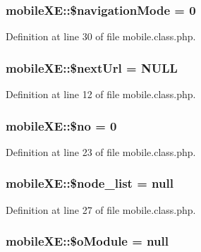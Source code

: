 \subsubsection[{\$navigation\+Mode}]{\setlength{\rightskip}{0pt plus 5cm}mobile\+X\+E\+::\$navigation\+Mode = 0}\label{classmobileXE_aa6e85b2d6fe4667d7d0a3a2b3f13bd12}


Definition at line 30 of file mobile.\+class.\+php.

\hypertarget{classmobileXE_adbdb5909b975bb776f91817d2392aaca}{}
\subsubsection[{\$next\+Url}]{\setlength{\rightskip}{0pt plus 5cm}mobile\+X\+E\+::\$next\+Url = N\+U\+L\+L}\label{classmobileXE_adbdb5909b975bb776f91817d2392aaca}


Definition at line 12 of file mobile.\+class.\+php.

\hypertarget{classmobileXE_a497e828014cdb6eaef56dd42d0f816e6}{}
\subsubsection[{\$no}]{\setlength{\rightskip}{0pt plus 5cm}mobile\+X\+E\+::\$no = 0}\label{classmobileXE_a497e828014cdb6eaef56dd42d0f816e6}


Definition at line 23 of file mobile.\+class.\+php.

\hypertarget{classmobileXE_af906479c52f412d0beae2252bad4ef35}{}
\subsubsection[{\$node\+\_\+list}]{\setlength{\rightskip}{0pt plus 5cm}mobile\+X\+E\+::\$node\+\_\+list = null}\label{classmobileXE_af906479c52f412d0beae2252bad4ef35}


Definition at line 27 of file mobile.\+class.\+php.

\hypertarget{classmobileXE_a64908b5e1d46537b4739036b1a00b689}{}
\subsubsection[{\$o\+Module}]{\setlength{\rightskip}{0pt plus 5cm}mobile\+X\+E\+::\$o\+Module = null}\label{classmobileXE_a64908b5e1d46537b4739036b1a00b689}


